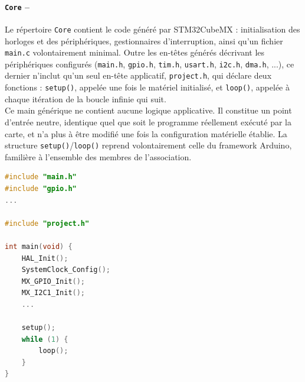 \hspace*{-\parindent}%
\begin{minipage}{0.5\textwidth}
    \paragraph*{\textbf{\texttt{Core} --}} Le répertoire \texttt{Core} contient le code généré par STM32CubeMX : initialisation
    des horloges et des périphériques, gestionnaires d'interruption, ainsi qu'un fichier \texttt{main.c} volontairement minimal.
    Outre les en-têtes générés décrivant les périphériques configurés (\texttt{main.h}, \texttt{gpio.h}, \texttt{tim.h},
    \texttt{usart.h}, \texttt{i2c.h}, \texttt{dma.h}, ...), ce dernier n'inclut qu'un seul en-tête applicatif,
    \texttt{project.h}, qui déclare deux fonctions : \texttt{setup()}, appelée une fois le matériel initialisé, et
    \texttt{loop()}, appelée à chaque itération de la boucle infinie qui suit.\\
     
    Ce \og main générique \fg{} ne contient aucune logique applicative. Il constitue un point d'entrée neutre, identique quel
    que soit le programme réellement exécuté par la carte, et n'a plus à être modifié une fois la configuration matérielle
    établie. La structure \texttt{setup()}/\texttt{loop()} reprend volontairement celle du framework Arduino, familière à
    l'ensemble des membres de l'association.
\end{minipage}
\hfill
\begin{minipage}{0.35\textwidth}
    \begin{lstlisting}[language=C, frame=tb]
#include "main.h"
#include "gpio.h"
...

#include "project.h"

int main(void) {
    HAL_Init();
    SystemClock_Config();
    MX_GPIO_Init();
    MX_I2C1_Init();
    ...

    setup();
    while (1) {
        loop();
    }
}
    \end{lstlisting}
\end{minipage}
\hfill\hfill

\vfill

